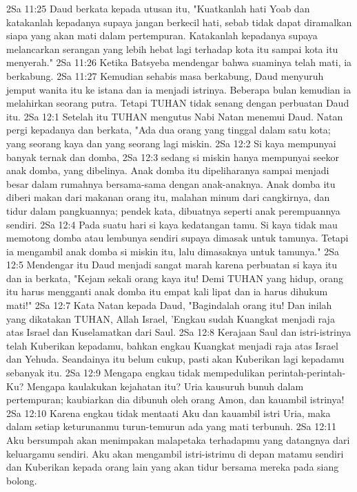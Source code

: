 2Sa 11:25  Daud berkata kepada utusan itu, "Kuatkanlah hati Yoab dan katakanlah kepadanya supaya jangan berkecil hati, sebab tidak dapat diramalkan siapa yang akan mati dalam pertempuran. Katakanlah kepadanya supaya melancarkan serangan yang lebih hebat lagi terhadap kota itu sampai kota itu menyerah."
2Sa 11:26  Ketika Batsyeba mendengar bahwa suaminya telah mati, ia berkabung.
2Sa 11:27  Kemudian sehabis masa berkabung, Daud menyuruh jemput wanita itu ke istana dan ia menjadi istrinya. Beberapa bulan kemudian ia melahirkan seorang putra. Tetapi TUHAN tidak senang dengan perbuatan Daud itu.
2Sa 12:1  Setelah itu TUHAN mengutus Nabi Natan menemui Daud. Natan pergi kepadanya dan berkata, "Ada dua orang yang tinggal dalam satu kota; yang seorang kaya dan yang seorang lagi miskin.
2Sa 12:2  Si kaya mempunyai banyak ternak dan domba,
2Sa 12:3  sedang si miskin hanya mempunyai seekor anak domba, yang dibelinya. Anak domba itu dipeliharanya sampai menjadi besar dalam rumahnya bersama-sama dengan anak-anaknya. Anak domba itu diberi makan dari makanan orang itu, malahan minum dari cangkirnya, dan tidur dalam pangkuannya; pendek kata, dibuatnya seperti anak perempuannya sendiri.
2Sa 12:4  Pada suatu hari si kaya kedatangan tamu. Si kaya tidak mau memotong domba atau lembunya sendiri supaya dimasak untuk tamunya. Tetapi ia mengambil anak domba si miskin itu, lalu dimasaknya untuk tamunya."
2Sa 12:5  Mendengar itu Daud menjadi sangat marah karena perbuatan si kaya itu dan ia berkata, "Kejam sekali orang kaya itu! Demi TUHAN yang hidup, orang itu harus mengganti anak domba itu empat kali lipat dan ia harus dihukum mati!"
2Sa 12:7  Kata Natan kepada Daud, "Bagindalah orang itu! Dan inilah yang dikatakan TUHAN, Allah Israel, 'Engkau sudah Kuangkat menjadi raja atas Israel dan Kuselamatkan dari Saul.
2Sa 12:8  Kerajaan Saul dan istri-istrinya telah Kuberikan kepadamu, bahkan engkau Kuangkat menjadi raja atas Israel dan Yehuda. Seandainya itu belum cukup, pasti akan Kuberikan lagi kepadamu sebanyak itu.
2Sa 12:9  Mengapa engkau tidak mempedulikan perintah-perintah-Ku? Mengapa kaulakukan kejahatan itu? Uria kausuruh bunuh dalam pertempuran; kaubiarkan dia dibunuh oleh orang Amon, dan kauambil istrinya!
2Sa 12:10  Karena engkau tidak mentaati Aku dan kauambil istri Uria, maka dalam setiap keturunanmu turun-temurun ada yang mati terbunuh.
2Sa 12:11  Aku bersumpah akan menimpakan malapetaka terhadapmu yang datangnya dari keluargamu sendiri. Aku akan mengambil istri-istrimu di depan matamu sendiri dan Kuberikan kepada orang lain yang akan tidur bersama mereka pada siang bolong.
